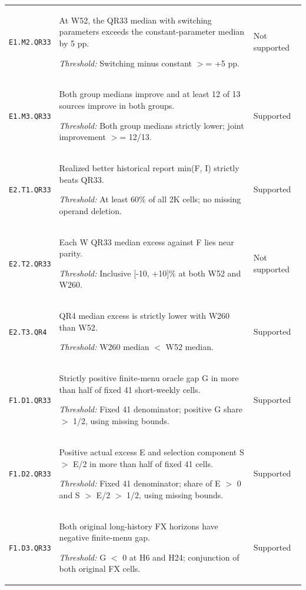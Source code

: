 \documentclass[12pt,a4paper]{article}
\begin{document}
{\begin{longtable}{p{2.0cm}p{10.5cm}p{2.5cm}}
\texttt{E1.\allowbreak{}M2.\allowbreak{}QR33} & At W52, the QR33 median with switching parameters exceeds the constant-parameter median by 5 pp.\par\emph{Threshold:} Switching minus constant \ensuremath{>}=\allowbreak{} +5 pp. & Not supported \\[3pt]
\texttt{E1.\allowbreak{}M3.\allowbreak{}QR33} & Both group medians improve and at least 12 of 13 sources improve in both groups.\par\emph{Threshold:} Both group medians strictly lower; joint improvement \ensuremath{>}=\allowbreak{} 12/\allowbreak{}13. & Supported \\[3pt]
\texttt{E2.\allowbreak{}T1.\allowbreak{}QR33} & Realized better historical report min(F,\allowbreak{} I) strictly beats QR33.\par\emph{Threshold:} At least 60\% of all 2K cells; no missing operand deletion. & Supported \\[3pt]
\texttt{E2.\allowbreak{}T2.\allowbreak{}QR33} & Each W QR33 median excess against F lies near parity.\par\emph{Threshold:} Inclusive [-10,\allowbreak{} +10]\% at both W52 and W260. & Not supported \\[3pt]
\texttt{E2.\allowbreak{}T3.\allowbreak{}QR4} & QR4 median excess is strictly lower with W260 than W52.\par\emph{Threshold:} W260 median \ensuremath{<} W52 median. & Supported \\[3pt]
\texttt{F1.\allowbreak{}D1.\allowbreak{}QR33} & Strictly positive finite-menu oracle gap G in more than half of fixed 41 short-weekly cells.\par\emph{Threshold:} Fixed 41 denominator; positive G share \ensuremath{>} 1/\allowbreak{}2,\allowbreak{} using missing bounds. & Supported \\[3pt]
\texttt{F1.\allowbreak{}D2.\allowbreak{}QR33} & Positive actual excess E and selection component S \ensuremath{>} E/\allowbreak{}2 in more than half of fixed 41 cells.\par\emph{Threshold:} Fixed 41 denominator; share of E \ensuremath{>} 0 and S \ensuremath{>} E/\allowbreak{}2 \ensuremath{>} 1/\allowbreak{}2,\allowbreak{} using missing bounds. & Supported \\[3pt]
\texttt{F1.\allowbreak{}D3.\allowbreak{}QR33} & Both original long-history FX horizons have negative finite-menu gap.\par\emph{Threshold:} G \ensuremath{<} 0 at H6 and H24; conjunction of both original FX cells. & Supported \\[3pt]

\end{longtable}}
\end{document}
